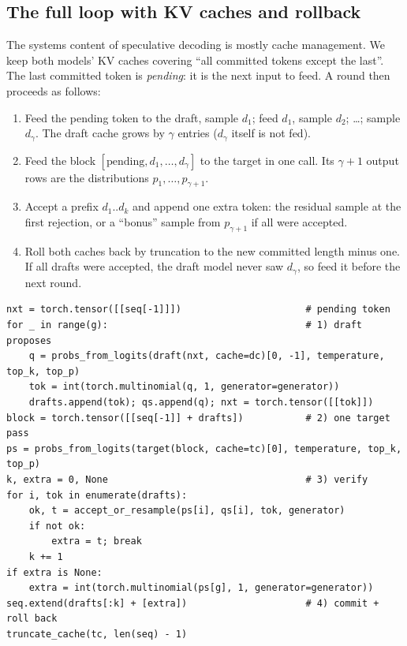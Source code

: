 \subsection{The full loop with KV caches and rollback}
The systems content of speculative decoding is mostly cache management. We keep both
models' KV caches covering ``all committed tokens except the last''. The last committed
token is \emph{pending}: it is the next input to feed. A round then proceeds as follows:
\begin{enumerate}
  \item Feed the pending token to the draft, sample $d_1$; feed $d_1$, sample $d_2$; \dots;
        sample $d_\gamma$. The draft cache grows by $\gamma$ entries ($d_\gamma$ itself is not fed).
  \item Feed the block $[\text{pending}, d_1,\dots,d_\gamma]$ to the target in one call. Its
        $\gamma+1$ output rows are the distributions $p_1,\dots,p_{\gamma+1}$.
  \item Accept a prefix $d_1..d_k$ and append one extra token: the residual sample at the
        first rejection, or a ``bonus'' sample from $p_{\gamma+1}$ if all were accepted.
  \item Roll both caches back by truncation to the new committed length minus one. If all
        drafts were accepted, the draft model never saw $d_\gamma$, so feed it before the
        next round.
\end{enumerate}

\begin{lstlisting}[caption={One round of speculative decoding (abridged from
\ident{speculative_generate}).},label={lst:efficient:specloop}]
nxt = torch.tensor([[seq[-1]]])                      # pending token
for _ in range(g):                                   # 1) draft proposes
    q = probs_from_logits(draft(nxt, cache=dc)[0, -1], temperature, top_k, top_p)
    tok = int(torch.multinomial(q, 1, generator=generator))
    drafts.append(tok); qs.append(q); nxt = torch.tensor([[tok]])
block = torch.tensor([[seq[-1]] + drafts])           # 2) one target pass
ps = probs_from_logits(target(block, cache=tc)[0], temperature, top_k, top_p)
k, extra = 0, None                                   # 3) verify
for i, tok in enumerate(drafts):
    ok, t = accept_or_resample(ps[i], qs[i], tok, generator)
    if not ok:
        extra = t; break
    k += 1
if extra is None:
    extra = int(torch.multinomial(ps[g], 1, generator=generator))
seq.extend(drafts[:k] + [extra])                     # 4) commit + roll back
truncate_cache(tc, len(seq) - 1)
\end{lstlisting}

